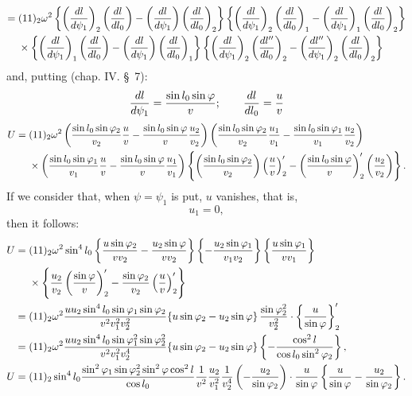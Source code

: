 \begingroup\scriptsize
\[
\begin{aligned}
={}&(11)_2\omega^2\left\{\left({dl\over d\psi_1}\right)_2\left({dl\over dl_0}\right)-
\left({dl\over d\psi_1}\right)\left({dl\over dl_0}\right)_2\right\}
\left\{\left({dl\over d\psi_1}\right)_2\left({dl\over dl_0}\right)_1-
\left({dl\over d\psi_1}\right)_1\left({dl\over dl_0}\right)_2\right\}\\
&\times\left\{\left({dl\over d\psi_1}\right)_1\left({dl\over dl_0}\right)-
\left({dl\over d\psi_1}\right)\left({dl\over dl_0}\right)_1\right\}
\left\{\left({dl\over d\psi_1}\right)_2\left({dl''\over dl_0}\right)_2-
\left({dl''\over d\psi_1}\right)_2\left({dl\over dl_0}\right)_2\right\}
\end{aligned}
\]
\endgroup
and, putting (chap. IV. \S\ 7):
\[
 {dl\over d\psi_1}={\sin l_0\sin\varphi\over v};
 \qquad {dl\over dl_0}={u\over v}
\]
\begingroup\scriptsize
\[
\begin{aligned}
U={}&(11)_2\omega^2
\left({\sin l_0\sin\varphi_2\over v_2}{u\over v}-{\sin l_0\sin\varphi\over v}{u_2\over v_2}\right)
\left({\sin l_0\sin\varphi_2\over v_2}{u_1\over v_1}-{\sin l_0\sin\varphi_1\over v_1}{u_2\over v_2}\right)\\
&\times\left({\sin l_0\sin\varphi_1\over v_1}{u\over v}-{\sin l_0\sin\varphi\over v}{u_1\over v_1}\right)
\left\{\left({\sin l_0\sin\varphi_2\over v_2}\right)\left({u\over v}\right)'_2-
\left({\sin l_0\sin\varphi\over v}\right)'_2\left({u_2\over v_2}\right)\right\}.
\end{aligned}
\]
\endgroup
If we consider that, when $\psi=\psi_1$ is put, $u$ vanishes, that is,
\[
 u_1=0,
\]
then it follows:
\begingroup\scriptsize
\[
\begin{aligned}
U={}&(11)_2\omega^2\sin^4l_0
\left\{{u\sin\varphi_2\over vv_2}-{u_2\sin\varphi\over vv_2}\right\}
\left\{-{u_2\sin\varphi_1\over v_1v_2}\right\}
\left\{{u\sin\varphi_1\over vv_1}\right\}\\
&\times\left\{{u_2\over v_2}\left({\sin\varphi\over v}\right)'_2-{\sin\varphi_2\over v_2}\left({u\over v}\right)'_2\right\}\\
={}&(11)_2\omega^2{uu_2\sin^4l_0\sin\varphi_1\sin\varphi_2\over v^2v_1^2v_2^2}
\{u\sin\varphi_2-u_2\sin\varphi\}\,{\sin\varphi_2^2\over v_2^2}\cdot\left\{{u\over \sin\varphi}\right\}'_2\\
={}&(11)_2\omega^2{uu_2\sin^4l_0\sin\varphi_1^2\sin\varphi_2^2\over v^2v_1^2v_2^4}
\{u\sin\varphi_2-u_2\sin\varphi\}\left\{-{\cos^2l\over \cos l_0\sin^2\varphi_2}\right\},\\
U={}&(11)_2\sin^4l_0{\sin^2\varphi_1\sin\varphi_2^2\sin^2\varphi\cos^2l\over \cos l_0}{1\over v^2}{u_2\over v_1^2}{1\over v_2^4}
\left(-{u_2\over \sin\varphi_2}\right)\cdot{u\over \sin\varphi}\left\{{u\over \sin\varphi}-{u_2\over \sin\varphi_2}\right\}.
\end{aligned}
\]
\endgroup

